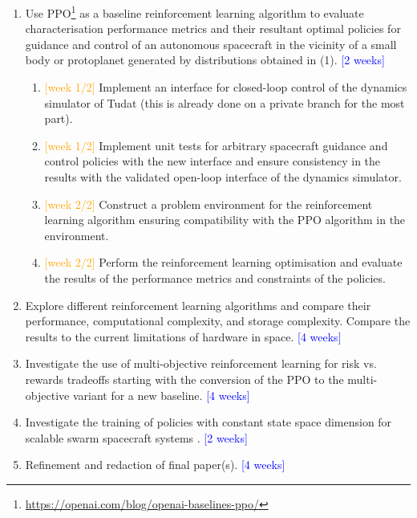 \begin{enumerate}
    \item Use \gls{PPO}\footnote{\url{https://openai.com/blog/openai-baselines-ppo/}} \cite{Schulman2017} as a baseline reinforcement learning algorithm to evaluate characterisation performance metrics and their resultant optimal policies for guidance and control of an autonomous spacecraft in the vicinity of a small body or protoplanet generated by distributions obtained in (1). \textcolor{blue}{[2 weeks]}
          \begin{enumerate}
              \item \textcolor{orange}{[week 1/2]} Implement an interface for closed-loop control of the dynamics simulator of Tudat (this is already done on a private branch for the most part).
              \item \textcolor{orange}{[week 1/2]} Implement unit tests for arbitrary spacecraft guidance and control policies with the new interface and ensure consistency in the results with the validated open-loop interface of the dynamics simulator.
              \item \textcolor{orange}{[week 2/2]} Construct a problem environment for the reinforcement learning algorithm ensuring compatibility with the \gls{PPO} algorithm in the environment.
              \item \textcolor{orange}{[week 2/2]} Perform the reinforcement learning optimisation and evaluate the results of the performance metrics and constraints of the policies.
          \end{enumerate}

    \item Explore different reinforcement learning algorithms and compare their performance, computational complexity, and storage complexity. Compare the results to the current limitations of hardware in space. \textcolor{blue}{[4 weeks]}

    \item Investigate the use of multi-objective reinforcement learning for risk vs. rewards tradeoffs \cite{Moffaert2014, Roijers2015, Yang2019, Belakaria2021, Hayes2022} starting with the conversion of the \gls{PPO} to the multi-objective variant \cite{Khoi2021} for a new baseline. \textcolor{blue}{[4 weeks]}

    \item Investigate the training of policies with constant state space dimension for scalable swarm spacecraft systems \cite{Huttenrauch2018}. \textcolor{blue}{[2 weeks]}
    
    \item Refinement and redaction of final paper(s). \textcolor{blue}{[4 weeks]}
 

\end{enumerate}
